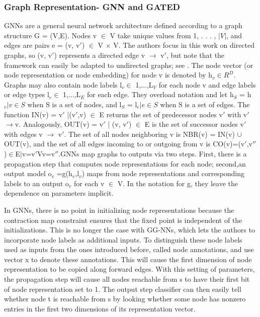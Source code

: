 \documentclass{article}
\begin{document}
\subsubsection{Graph Representation- GNN and GATED}
GNNs are a general neural network architecture defined according to a graph structure G = (V,E). Nodes v $\in$ V take unique values from 1, . . . , $|V|$, and edges are pairs e = (v, v$'$) $\in$ V × V. The authors focus in this work on directed graphs, so (v, v$'$) represents a directed edge v $\rightarrow$ v$'$, but note that the framework can easily be adapted to undirected graphs; see \cite{10.1109/TNN.2008.2005605}. The node vector (or node representation or node embedding) for node v is denoted by h$_v \in R^D$. Graphs may also contain node labels l$_v \in$ {1,...,L$_V$} for each node v and edge labels or edge types l$_e \in$ {1,...,L$_E$} for each edge. They overload notation and let h$_S$ = {h$_v | v \in S$} when S is a set of nodes, and l$_S$ = {l$_e | e \in S$} when S is a set of edges. The function IN(v) = {v$'$ |(v$'$,v) $\in$ E} returns the set of predecessor nodes v$'$ with v$'$ $\rightarrow$v. Analogously, OUT(v) = {v$'$ | (v, v$'$) $\in$ E} is the set of successor nodes v$'$ with edges v $\rightarrow$ v$'$. The set of all nodes neighboring v is NBR(v) = IN(v) $\cup$ OUT(v), and the set of all edges incoming to or outgoing from v is CO(v)={(v$'$,v$''$)$\in$E$|$v=v$'$Vv=v$''$}.GNNs map graphs to outputs via two steps. First, there is a propagation step that computes node representations for each node; second,an output model o$_v$ =g(h$_v$,l$_v$) maps from node representations and corresponding labels to an output o$_v$ for each v $\in$ V. In the notation for g, they leave the dependence on parameters implicit.

In GNNs, there is no point in initializing node representations because the contraction map constraint ensures that the fixed point is independent of the initializations. This is no longer the case with GG-NNs, which lets the authors to incorporate node labels as additional inputs. To distinguish these node labels used as inputs from the ones introduced before, called node annotations, and use vector x to denote these annotations. This will cause the first dimension of node representation to be copied along forward edges. With this setting of parameters, the propagation step will cause all nodes reachable from s to have their first bit of node representation set to 1. The output step classifier can then easily tell whether node t is reachable from s by looking whether some node has nonzero entries in the first two dimensions of its representation vector.
\end{document}
